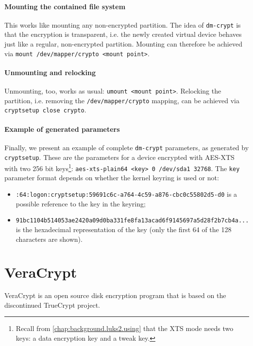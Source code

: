 \paragraph{Mounting the contained file system}
This works like mounting any non-encrypted partition. The idea of \texttt{dm-crypt} is that the encryption is transparent, i.e. the newly created virtual device behaves just like a regular, non-encrypted partition. Mounting can therefore be achieved via \texttt{mount /dev/mapper/crypto <mount point>}.

\paragraph{Unmounting and relocking}
Unmounting, too, works as usual: \texttt{umount <mount point>}. Relocking the partition, i.e. removing the \texttt{/dev/mapper/crypto} mapping, can be achieved via \texttt{cryptsetup close crypto}.

\paragraph{Example of generated parameters} Finally, we present an example of complete \texttt{dm-crypt} parameters, as generated by \texttt{cryptsetup}. These are the parameters for a device encrypted with AES-XTS with two 256 bit keys\footnote{\label{fn:otherapproaches.linux.aesxtskeys} Recall from \autoref{chap:background.luks2.using} that the XTS mode needs two keys: a data encryption key and a tweak key.}: \texttt{aes-xts-plain64 <key> 0 /dev/sda1 32768}. The \texttt{key} parameter format depends on whether the kernel keyring is used or not:
\begin{itemize}
	\item \texttt{:64:logon:cryptsetup:59691c6c-a764-4c59-a876-cbc0c55802d5-d0} is a possible reference to the key in the keyring;
	\item \texttt{91bc1104b514053ae2420a09d0ba331fe8fa13acad6f9145697a5d28f2b7cb4a...} is the hexadecimal representation of the key (only the first 64 of the 128 characters are shown).
\end{itemize}

\section{VeraCrypt}
\label{chap:otherapproaches.veracrypt}
VeraCrypt is an open source disk encryption program that is based on the discontinued TrueCrypt project.

